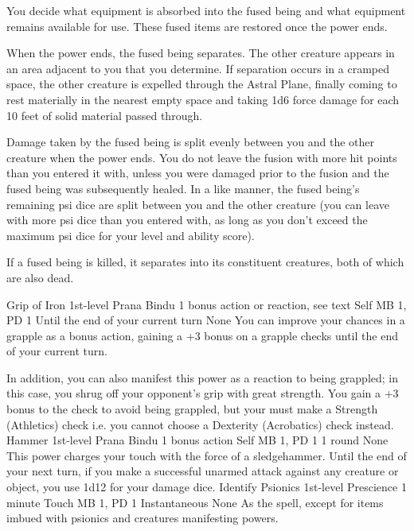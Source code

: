 You decide what equipment is absorbed into the fused being
and what equipment remains available for use. These fused
items are restored once the power ends.

When the power ends, the fused being separates. The other
creature appears in an area adjacent to you that you determine.
If separation occurs in a cramped space, the other creature
is expelled through the Astral Plane, finally coming to rest
materially in the nearest empty space and taking 1d6 force
damage for each 10 feet of solid material passed through.

Damage taken by the fused being is split evenly between you
and the other creature when the power ends. You do not leave
the fusion with more hit points than you entered it with,
unless you were damaged prior to the fusion and the fused
being was subsequently healed. In a like manner, the fused
being's remaining psi dice are split between you and
the other creature (you can leave with more psi dice than you
entered with, as long as you don't exceed the maximum psi dice
for your level and ability score).

If a fused being is killed, it separates into its constituent
creatures, both of which are also dead.

\DndPowerHeader%
    {Grip of Iron\label{pwr:grip_of_iron}}
    {1st-level Prana Bindu}
    {1 bonus action or reaction, see text}
    {Self}
    {MB 1, PD 1}
    {Until the end of your current turn}
    {None}
You can improve your chances in a grapple
as a bonus action, gaining a +3 bonus on a grapple checks
until the end of your current turn.

In addition, you can also manifest this power as a reaction
to being grappled; in this case, you shrug off your opponent's
grip with great strength. You gain a +3 bonus to the check
to avoid being grappled, but your must make a
Strength (Athletics) check
i.e. you cannot choose a Dexterity (Acrobatics) check instead.
\DndPowerHeader%
    {Hammer\label{pwr:hammer}}
    {1st-level Prana Bindu}
    {1 bonus action}
    {Self}
    {MB 1, PD 1}
    {1 round}
    {None}
This power charges your touch with the force
of a sledgehammer. Until the end of your next turn, if you
make a successful unarmed attack against any creature or object,
you use 1d12 for your damage dice.
\DndPowerHeader%
    {Identify Psionics\label{pwr:identify_psionics}}
    {1st-level Prescience}
    {1 minute}
    {Touch}
    {MB 1, PD 1}
    {Instantaneous}
    {None}
As the  spell, except for
items imbued with psionics and creatures manifesting powers.

